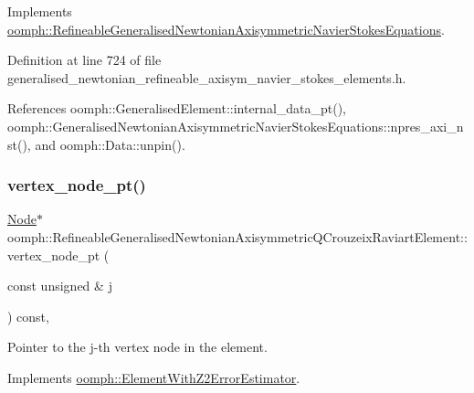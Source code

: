 Implements \hyperlink{classoomph_1_1RefineableGeneralisedNewtonianAxisymmetricNavierStokesEquations_adec2514256f89cd8ff2694abd8178675}{oomph\+::\+Refineable\+Generalised\+Newtonian\+Axisymmetric\+Navier\+Stokes\+Equations}.



Definition at line 724 of file generalised\+\_\+newtonian\+\_\+refineable\+\_\+axisym\+\_\+navier\+\_\+stokes\+\_\+elements.\+h.



References oomph\+::\+Generalised\+Element\+::internal\+\_\+data\+\_\+pt(), oomph\+::\+Generalised\+Newtonian\+Axisymmetric\+Navier\+Stokes\+Equations\+::npres\+\_\+axi\+\_\+nst(), and oomph\+::\+Data\+::unpin().

\mbox{\label{classoomph_1_1RefineableGeneralisedNewtonianAxisymmetricQCrouzeixRaviartElement_ab40a282339a7f9238f88de7f88654f15}} 
\subsubsection{\texorpdfstring{vertex\+\_\+node\+\_\+pt()}{vertex\_node\_pt()}}
{\footnotesize\ttfamily \hyperlink{classoomph_1_1Node}{Node}$\ast$ oomph\+::\+Refineable\+Generalised\+Newtonian\+Axisymmetric\+Q\+Crouzeix\+Raviart\+Element\+::vertex\+\_\+node\+\_\+pt (\begin{DoxyParamCaption}\item[{const unsigned \&}]{j }\end{DoxyParamCaption}) const\hspace{0.3cm}{\ttfamily [inline]}, {\ttfamily [virtual]}}



Pointer to the j-\/th vertex node in the element. 



Implements \hyperlink{classoomph_1_1ElementWithZ2ErrorEstimator_a0eedccc33519f852c5dc2055ddf2774b}{oomph\+::\+Element\+With\+Z2\+Error\+Estimator}.



